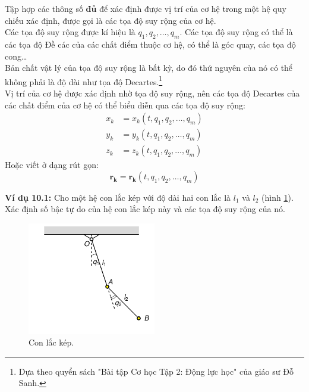 Tập hợp các thông số \textbf{đủ} để xác định được vị trí của cơ hệ trong một hệ quy chiếu xác định, được gọi là các tọa độ suy rộng của cơ hệ.\\
Các tọa độ suy rộng được kí hiệu là $q_1, q_2, \ldots, q_m$. Các tọa độ suy rộng có thể là các tọa độ Đề các của các chất điểm thuộc cơ hệ, có thể là góc quay, các tọa độ cong\ldots\\
Bản chất vật lý của tọa độ suy rộng là bất kỳ, do đó thứ nguyên của nó có thể không phải là độ dài như tọa độ Decartes.\footnote{Dựa theo quyển sách "Bài tập Cơ học Tập 2: Động lực học" của giáo sư Đỗ Sanh.}\\
Vị trí của cơ hệ được xác định nhờ tọa độ suy rộng, nên các tọa độ Decartes của các chất điểm của cơ hệ có thể biểu diễn qua các tọa độ suy rộng:
\begin{align*}
    x_k &= x_k(t, q_1, q_2, \ldots, q_m)\\
    y_k &= y_k(t, q_1, q_2, \ldots, q_m)\\
    z_k &= z_k(t, q_1, q_2, \ldots, q_m)
\end{align*}
Hoặc viết ở dạng rút gọn:
\begin{equation*}
    \mathbf{r_k} = \mathbf{r_k}(t, q_1, q_2, \ldots, q_m)
\end{equation*}

\textbf{Ví dụ 10.1:} Cho một hệ con lắc kép với độ dài hai con lắc là \(l_1\) và \(l_2\) (hình \ref{fig:Double_Pendulum}). Xác định số bậc tự do của hệ con lắc kép này và các tọa độ suy rộng của nó.

\begin{figure}[!h]
    \centering
    \includegraphics[width=0.5\textwidth]{Tuan10/Figures/Double_Pendulum/Double_Pendulum.pdf}
    \caption{Con lắc kép.}
    \label{fig:Double_Pendulum}
\end{figure}

